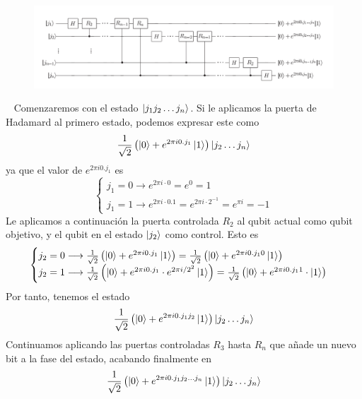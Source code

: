 \documentclass[a4paper]{article}
\numberwithin{equation}{section}
\begin{document}
\begin{figure}[h] \label{fig_qft}
\centering
\includegraphics[scale=0.65]{qft}
\end{figure}\ \linebreak
Comenzaremos con el estado $\ket{j_1 j_2 \ldots j_n}$. Si le aplicamos la puerta de Hadamard al primero estado, podemos expresar este como
\begin{equation}
\frac{1}{\sqrt{2}}\left( \ket{0} + e^{2\pi i 0.j_1}\ket{1} \right)
\ket{j_2 \ldots j_n}
\end{equation}
ya que el valor de $e^{2\pi i 0.j_1}$ es
\begin{equation}
\begin{cases}
j_1 = 0 \longrightarrow e^{2\pi i \cdot 0} = e^0 = 1 \\
j_1 = 1 \longrightarrow e^{2\pi i \cdot 0.\text{1}} = e^{2\pi i \cdot 2^{-1}} = e^{\pi i} = -1
\end{cases}
\end{equation}
Le aplicamos a continuación la puerta controlada $R_2$ al qubit actual como qubit objetivo, y el qubit en el estado $\ket{j_2}$ como control.
Esto es
\begin{equation}
\begin{cases}
j_2 = 0 \longrightarrow \frac{1}{\sqrt{2}}\left( \ket{0} + e^{2\pi i 0.j_1} \ket{1} \right)
=
\frac{1}{\sqrt{2}}\left( \ket{0} + e^{2\pi i 0.j_1 0} \ket{1} \right) \\
j_2 = 1 \longrightarrow
\frac{1}{\sqrt{2}}\left( \ket{0} + e^{2\pi i 0.j_1}\cdot e^{2\pi i/2^2} \ket{1} \right)
=
\frac{1}{\sqrt{2}}\left( \ket{0} + e^{2\pi i 0.j_1 1}\cdot \ket{1} \right)
\end{cases}
\end{equation}
Por tanto, tenemos el estado
\begin{equation}
\frac{1}{\sqrt{2}}\left( \ket{0} + e^{2\pi i 0.j_1 j_2}\ket{1} \right)
\ket{j_2 \ldots j_n}
\end{equation}
Continuamos aplicando las puertas controladas $R_3$ hasta $R_n$ que añade un nuevo bit a la fase del estado, acabando finalmente en
\begin{equation}
\frac{1}{\sqrt{2}}\left( \ket{0} + e^{2\pi i 0.j_1 j_2\ldots j_n}\ket{1} \right)
\ket{j_2 \ldots j_n}
\end{equation}
\end{document}
